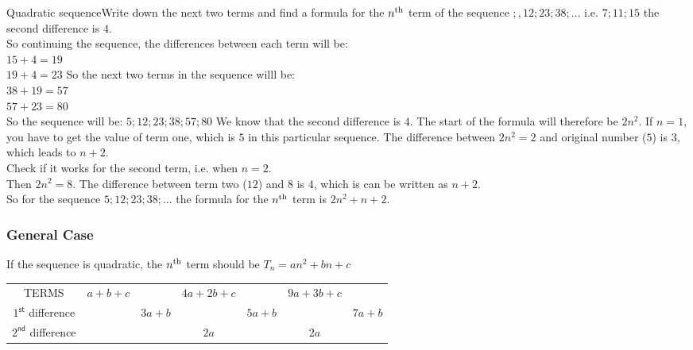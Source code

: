 
\begin{wex}{Quadratic sequence}{Write down the next two terms and find a formula for the $n^{\rm th}$ term of the sequence $;, 12; 23; 38;\ldots$}{ 
i.e. $7 ; 11; 15$
the second difference is $4$.\\
So continuing the sequence, the differences between each term will be:\\
$15 + 4 = 19$\\
$19 + 4 = 23$
So the next two terms in the sequence willl be:\\
$38 + 19 = 57$\\
$57 + 23 = 80$\\
So the sequence will be:
$5; 12; 23; 38; 57; 80$
We know that the second difference is $4$. The start of the formula will therefore be $2n^2$.
If $n=1$, you have to get the value of term one, which is $5$ in this particular sequence.  The difference between $2n^2 = 2$ and original number ($5$) is $3$, which leads to $n+2$.\\
Check if it works for the second term, i.e. when $n=2$.\\
Then $2n^2=8$.  The difference between term two ($12$) and $8$ is $4$, which is can be written as $n+2$.\\
So for the sequence $5; 12; 23; 38;\ldots$ the formula for the $n^{\rm th}$ term is $2n^2 + n + 2$.
}
\end{wex}

\subsubsection{General Case}
If the sequence is quadratic, the $n^{\rm th}$ term should be $T_n = an^2 + bn + c$

\begin{center}
\begin{tabular}{ccccccc}
TERMS & $a+b+c$ && $4a+2b+c$ && $9a+3b+c$ & \\
$1^{\textsf{st}}$ difference && $3a+b$ && $5a+b$ && $7a+b$ \\ 
$2^{\textsf{nd}}$ difference &&& $2a$ && $2a$ & \\
\end{tabular}
\end{center}

